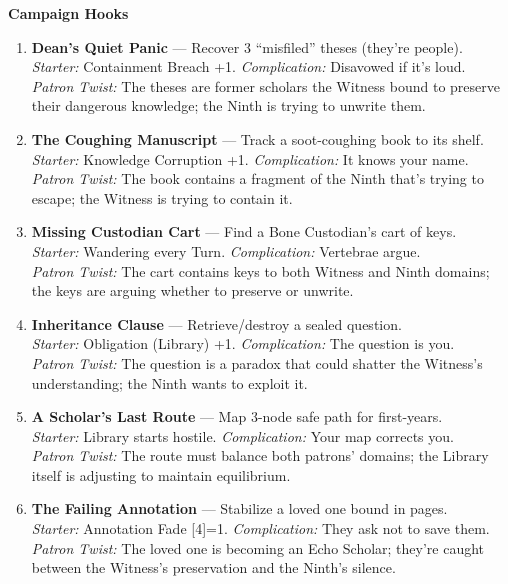 \documentclass[10pt,letterpaper]{article}
\newcommand{\sectionheader}[1]{\vspace{0.5em}\textbf{\large #1}\\[0.3em]}
\begin{document}
\sectionheader{Campaign Hooks}
\begin{enumerate}[leftmargin=*]
\item \textbf{Dean's Quiet Panic} --- Recover 3 ``misfiled'' theses (they're people).\\
\emph{Starter:} Containment Breach +1. \emph{Complication:} Disavowed if it's loud. \\
\emph{Patron Twist:} The theses are former scholars the Witness bound to preserve their dangerous knowledge; the Ninth is trying to unwrite them.

\item \textbf{The Coughing Manuscript} --- Track a soot-coughing book to its shelf.\\
\emph{Starter:} Knowledge Corruption +1. \emph{Complication:} It knows your name. \\
\emph{Patron Twist:} The book contains a fragment of the Ninth that's trying to escape; the Witness is trying to contain it.

\item \textbf{Missing Custodian Cart} --- Find a Bone Custodian's cart of keys.\\
\emph{Starter:} Wandering every Turn. \emph{Complication:} Vertebrae argue. \\
\emph{Patron Twist:} The cart contains keys to both Witness and Ninth domains; the keys are arguing whether to preserve or unwrite.

\item \textbf{Inheritance Clause} --- Retrieve/destroy a sealed question.\\
\emph{Starter:} Obligation (Library) +1. \emph{Complication:} The question is you. \\
\emph{Patron Twist:} The question is a paradox that could shatter the Witness's understanding; the Ninth wants to exploit it.

\item \textbf{A Scholar's Last Route} --- Map 3-node safe path for first-years.\\
\emph{Starter:} Library starts hostile. \emph{Complication:} Your map corrects you. \\
\emph{Patron Twist:} The route must balance both patrons' domains; the Library itself is adjusting to maintain equilibrium.

\item \textbf{The Failing Annotation} --- Stabilize a loved one bound in pages.\\
\emph{Starter:} Annotation Fade [4]=1. \emph{Complication:} They ask not to save them. \\
\emph{Patron Twist:} The loved one is becoming an Echo Scholar; they're caught between the Witness's preservation and the Ninth's silence.


\end{enumerate}
\end{document}
